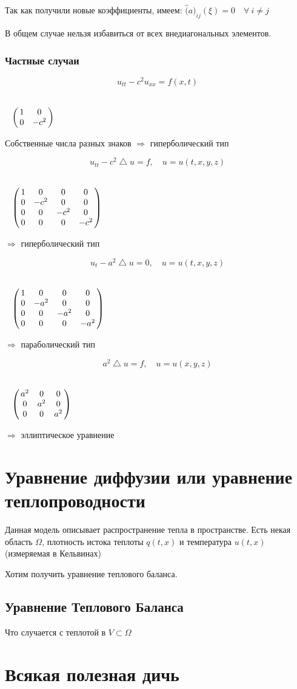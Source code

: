 \documentclass[12pt]{report}
\begin{document}
Так как получили новые коэффициенты, имеем: $\hat(a)_{i j}(\xi) = 0 \quad \forall \: i \ne j$

В общем случае нельзя избавиться от всех внедиагональных элементов. 

\subsubsection{Частные случаи}

$$u_{tt} - c ^ 2 u_{xx} = f(x,t)$$

$\bordermatrix{
    ~ & ~ & ~ \cr
    ~ & 1 & 0 \cr 
    ~ & 0 & - c ^ 2
    }$
    
Собственные числа разных знаков $\Longrightarrow$ гиперболический тип

$$u_{tt} - c ^ 2 \bigtriangleup u = f, \quad u = u(t, x, y, z)$$

$\bordermatrix{
    ~ & ~ & ~ & ~ & ~ \cr
    ~ & 1 & 0 & 0 & 0 \cr 
    ~ & 0 & - c ^ 2 & 0 & 0 \cr
    ~ & 0 & 0 & - c ^ 2 & 0 \cr
    ~ & 0 & 0 & 0 & - c ^ 2
    }$

$\Longrightarrow$ гиперболический тип

$$u_t - a ^ 2 \bigtriangleup u = 0, \quad u = u(t, x, y, z)$$

$\bordermatrix{
    ~ & ~ & ~ & ~ & ~ \cr
    ~ & 1 & 0 & 0 & 0 \cr 
    ~ & 0 & - a ^ 2 & 0 & 0 \cr
    ~ & 0 & 0 & - a ^ 2 & 0 \cr
    ~ & 0 & 0 & 0 & - a ^ 2
    }$
    
$\Longrightarrow$ параболический тип

$$a ^ 2 \bigtriangleup u = f, \quad u = u(x, y, z)$$

$\bordermatrix{
    ~ & ~ & ~ & ~ \cr
    ~ & a ^ 2 & 0 & 0 \cr 
    ~ & 0 & a ^ 2 & 0 \cr
    ~ & 0 & 0 & a ^ 2 
    }$
    
$\Longrightarrow$ эллиптическое уравнение


\section{Уравнение диффузии или уравнение теплопроводности}
Данная модель описывает распространение тепла в пространстве. Есть некая область $\Omega$, плотность истока теплоты $q(t, x)$ и температура $u(t, x)$ (измеряемая в Кельвинах)

Хотим получить уравнение теплового баланса. 

\subsection{Уравнение Теплового Баланса}

Что случается с теплотой в $V \subset \Omega$ 



\section{Всякая полезная дичь}
\end{document}
